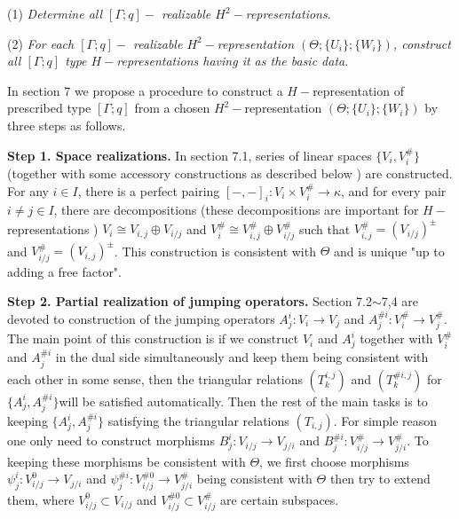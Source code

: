 \def\CTEXPreproc{Created by ctex v0.2.12, don't edit!}\documentclass[11pt]{article}
\begin{document}
     \noindent (1) \textit{Determine all $[\Gamma ;q]-$ realizable $H^2 -$representations}.

     \noindent (2) \textit{For each $[\Gamma ;q]-$ realizable $H^2 -$representation $( \Theta ; \{ U_i \} ; \{ W_i \}    )$, construct all  $[\Gamma ;q]$ type $H-$representations having it as the basic data}.

     In section 7 we propose a procedure to construct a $H-$representation of prescribed type $[\Gamma ;q]$ from a chosen $H^2 -$representation $( \Theta ; \{ U_i \} ; \{ W_i \}    )$ by three steps as follows.

     \noindent \textbf{Step 1. Space realizations.} In section 7.1, series of linear spaces $\{ V_i , V^{\#}_i \} $ (together with some accessory constructions as described below ) are constructed. For any $i\in I$, there is a perfect pairing
     $[-,-]_i : V_i \times V^{\#}_i \rightarrow \kappa$, and for every pair $i\neq j \in I$, there are decompositions (these decompositions are important for $H-$representations ) $V_i \cong V_{i,j} \oplus V_{i/j}$ and  $V^{\#} _i \cong V^{\#} _{i,j} \oplus V^{\#}_{i/j}$ such that $V^{\#}_{i,j} = ( V_{i/j}   )^{\pm}$ and $V^{\#}_{i/j} = ( V_{i,j}   )^{\pm}  $. This construction is  consistent with $\Theta$ and is unique "up to adding a free factor".

      \noindent \textbf{Step 2. Partial realization of jumping operators. } Section 7.2$\sim$7,4 are devoted to construction of the jumping operators $A^i _j : V_i \rightarrow V_j$ and $A^{\# i} _j : V^{\#}_i \rightarrow V^{\#}_j $.  The main point of this construction is if we construct $V_i$ and $A^i _j$ together with $V^{\#}_i$ and $A^{\# i}_j $ in the dual side simultaneously and keep them being consistent with each other in some sense, then the triangular relations $(T^{i,j}_k)$ and $(T^{\# i,j}_k )$ for $\{ A^i _j , A^{\# i} _j \}$will be satisfied automatically. Then the rest of the main tasks is to keeping $\{ A^i _j , A^{\# i} _j \}$ satisfying the triangular relations $(T_{i,j})$. For simple reason one only need to construct morphisms  $ B^i _j : V_{i/j} \rightarrow V_{j/i}$ and $B^{\# i}_j : V^{\#}_{i/j}\rightarrow V^{\#}_{j/i}$. To keeping these morphisms be consistent with $\Theta$, we first choose morphisms $\psi^{ i}_j : V^0 _{i/j} \rightarrow V_{j/i}  $ and  $\psi^{\# i}_j : V^{\# 0} _{i/j} \rightarrow V^{\#}_{j/i}  $ being consistent with $\Theta$ then try to extend them, where $V^0 _{i/j} \subset V_{i/j} $ and  $V^{\# 0} _{i/j}\subset V^{\#}_{i/j}$ are certain subspaces.
\end{document}
